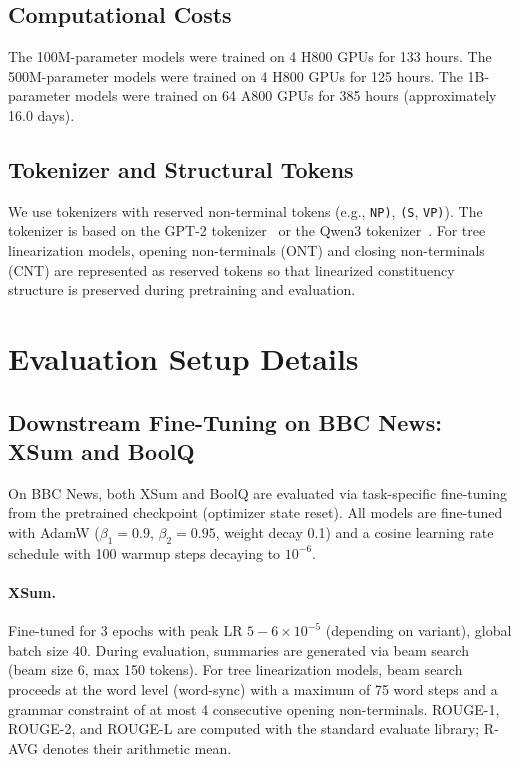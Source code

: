 \documentclass[11pt]{article}
\begin{document}
\subsection{Computational Costs}
The 100M-parameter models were trained on 4 H800 GPUs for 133 hours. The 500M-parameter models were trained on 4 H800 GPUs for 125 hours. The 1B-parameter models were trained on 64 A800 GPUs for 385 hours (approximately 16.0 days).

\subsection{Tokenizer and Structural Tokens}
We use tokenizers with reserved non-terminal tokens (e.g., \texttt{NP)}, \texttt{(S}, \texttt{VP)}).
The tokenizer is based on the GPT-2 tokenizer~\cite{radford2019language} or the Qwen3 tokenizer~\cite{yang2025qwen3}.
For tree linearization models, opening non-terminals (ONT) and closing non-terminals (CNT) are represented as reserved tokens so that linearized constituency structure is preserved during pretraining and evaluation.

\section{Evaluation Setup Details}

\subsection{Downstream Fine-Tuning on BBC News: XSum and BoolQ}
On BBC News, both XSum and BoolQ are evaluated via task-specific fine-tuning from the pretrained checkpoint (optimizer state reset).
All models are fine-tuned with AdamW ($\beta_1{=}0.9$, $\beta_2{=}0.95$, weight decay 0.1) and a cosine learning rate schedule with 100 warmup steps decaying to $10^{-6}$.

\paragraph{XSum.} Fine-tuned for 3 epochs with peak LR $5{-}6\times10^{-5}$ (depending on variant), global batch size 40.
During evaluation, summaries are generated via beam search (beam size 6, max 150 tokens).
For tree linearization models, beam search proceeds at the word level (word-sync) with a maximum of 75 word steps and a grammar constraint of at most 4 consecutive opening non-terminals.
ROUGE-1, ROUGE-2, and ROUGE-L are computed with the standard evaluate library; R-AVG denotes their arithmetic mean.
\end{document}
